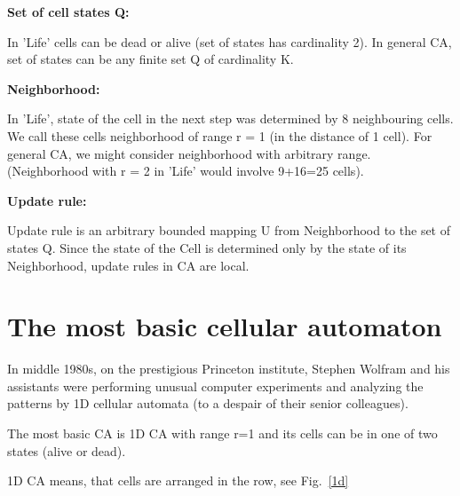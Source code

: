 \textbf{Set of cell states Q:}

In 'Life' cells can be dead or alive (set of states has cardinality 2). 
In general CA, set of states can be any finite set Q of cardinality K.
\bigskip

\textbf{Neighborhood:}

In 'Life', state of the cell in the next step was determined
by 8 neighbouring cells. We call these cells neighborhood of range r = 1 (in the distance of 1 cell).
For general CA, we might consider neighborhood
with arbitrary range.
(Neighborhood with r = 2 in 'Life' would involve 9+16=25 cells).

\bigskip

\textbf{Update rule:}

Update rule is an arbitrary bounded mapping U from Neighborhood to the set of states Q.
Since the state of the Cell is determined only by the state of its Neighborhood, update rules in CA are local.

\section{The most basic cellular automaton} 

In middle 1980s, on the prestigious Princeton institute,
Stephen Wolfram and his assistants were performing unusual computer experiments \cite{levy} and analyzing the patterns by 1D cellular automata (to a despair of their senior colleagues)\cite{levy}.

The most basic CA is 1D CA with range r=1 and its cells can be in one of two states (alive or dead).

1D CA means, that cells are arranged in the row, see Fig.~\ref{1d}

